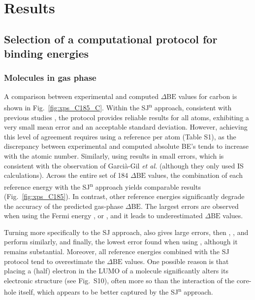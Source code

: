 \documentclass[%
aip,
amsmath,amssymb,
preprint,%
jcp,
showkeys,
]{revtex4-2}
\def\dbe{\ensuremath{\Delta\text{BE}}}
\begin{document}
\section{Results}\label{sec:results}


\subsection{Selection of a computational protocol for binding energies}\label{sec:proto}

\subsubsection{Molecules in gas phase}

A comparison between experimental and computed \dbe{} values for carbon is shown in Fig.~\ref{fig:xps_C185_C}. Within the SJ\textsuperscript{n} approach, consistent with previous studies \cite{pueyobellafontPredictingCoreLevel2017,golzeAccurateAbsoluteRelative2020}, the  protocol provides reliable results for all atoms, exhibiting a very small mean error and an acceptable standard deviation. However, achieving this level of agreement requires using a reference per atom (Table S1), as the discrepancy between experimental and computed absolute BE's tends to increase with the atomic number. Similarly, using  results in small errors, which is consistent with the observation of Garcià-Gil \textit{et al.}\cite{garcia-gilCalculationCoreLevel2012} (although they only used IS calculations). Across the entire set of 184 \dbe{} values, the combination of each reference energy with the SJ\textsuperscript{n} approach yields comparable results (Fig.~\ref{fig:xps_C185}). In contrast, other reference energies significantly degrade the accuracy of the predicted gas-phase \dbe{}. The largest errors are observed when using the Fermi energy , or , and it leads to underestimated \dbe{} values. 

Turning more specifically to the SJ approach,  also gives large errors, then , , and  perform similarly, and finally, the lowest error found when using \cpx{\phi}, although it remains substantial. Moreover, all reference energies combined with the SJ protocol tend to overestimate the \dbe{} values. One possible reason is that placing a (half) electron in the LUMO of a molecule significantly alters its electronic structure (see Fig.~S10), often more so than the interaction of the core-hole itself, which appears to be better captured by the SJ\textsuperscript{n} approach.\cite{taucherFinalStateSimulationsCoreLevel2020}
\end{document}
